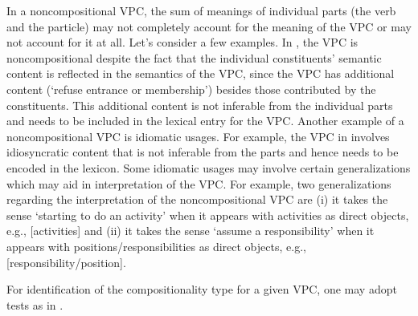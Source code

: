 \documentclass[output=paper,modfonts,nonflat]{langsci/langscibook}
\begin{document}
In a noncompositional VPC, the sum of meanings of individual parts (the verb and the particle) may not completely account for the meaning of the VPC or may not account for it at all. Let's consider a few examples. In , the VPC  is noncompositional  despite the fact that the individual constituents' semantic content is reflected in the semantics of the VPC, since the VPC has additional content (`refuse entrance or membership') besides those contributed by the constituents. This additional content is not inferable from the individual parts and needs to be included in the lexical entry for the VPC. Another example of a noncompositional VPC is idiomatic usages. For example, the VPC  in  involves idiosyncratic content that is not inferable from the parts and hence needs to be encoded in the lexicon. Some idiomatic usages may involve certain generalizations which may aid in interpretation of the VPC. For example, two generalizations regarding the interpretation of the noncompositional VPC  are (i) it takes the sense `starting to do an activity' when it appears with activities as direct objects, e.g.,  [activities] and (ii) it takes the sense `assume a responsibility' when it appears with positions/responsibilities as direct objects, e.g.,  [responsibility/position]. 

For identification of the compositionality type for a given VPC, one may adopt tests as in .
\end{document}

